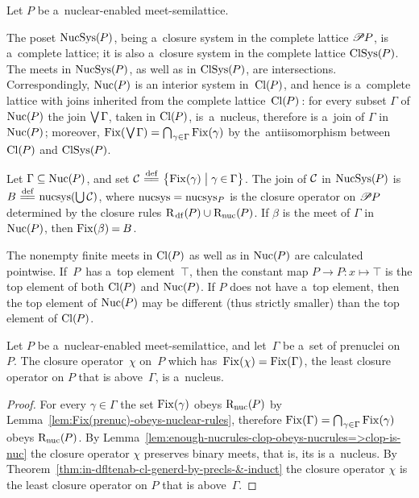 \documentclass[11pt,letterpaper]{article}
\renewcommand{\thmskip}{\bigskip}
\renewcommand{\interskip}{\medskip}
\begin{document}
Let $P$ be a~nuclear-enabled meet-semilattice.

The poset $\NucSys(\negtinysp P)$, %
	being a~closure system in the complete lattice $\Pow\negtinysp P$,
is a~complete lattice; it is also a~closure system in the complete lattice $\ClSys(\negtinysp P)$.
The meets in $\NucSys(\negtinysp P)$, as well as in $\ClSys(\negtinysp P)$, are intersections.
Correspondingly, $\Nuc(\negtinysp P)$ is an interior system in~$\Cl(\negtinysp P)$,
	and hence is a~complete lattice with joins inherited
		from the complete lattice~$\Cl(\negtinysp P)\dtinysp$:
for every subset $\Gamma$ of $\Nuc(\negtinysp P)$ the join $\tJoin\negtinysp\Gamma$,
	taken in $\Cl(\negtinysp P)$,
is~a~nucleus, therefore is a~join of $\Gamma$ in $\Nuc(\negtinysp P)\tinysp$;
moreover, $\Fix(\tinysp\tJoin\negtinysp\Gamma)=\Inters_{\tinysp\gamma\in\Gamma}\Fix(\gamma)$
by the~antiisomorphism between $\Cl(\negtinysp P)$ and $\ClSys(\negtinysp P)$.

Let $\Gamma\subseteq\Nuc(\negtinysp P)$,
	and set $\coll{C}\defeq\bigset{\Fix(\gamma)\bigsuchthat\gamma\narrt\in\Gamma}$.
The join of $\coll{C}$ in $\NucSys(\negtinysp P)$ is $B\defeq\nucsys(\tUnion\coll{C})$,
where $\nucsys=\nucsys_P$ is the closure operator on $\Pow\negtinysp P$
	determined by the closure rules $\Rulesdflt(\negtinysp P)\union\Rulesnuc(\negtinysp P)\tinysp$.
If $\beta$ is the meet of $\Gamma$ in $\Nuc(\negtinysp P)$, then $\Fix(\beta)\narrt=B$.

The nonempty finite meets in $\Cl(\negtinysp P)$ as well as in $\Nuc(\negtinysp P)$ are calculated pointwise.
If~$P$~has a~top element~$\top$,
then the constant map $P\to P : x\mapsto \top$
is the top element of both $\Cl(\negtinysp P)$ and $\Nuc(\negtinysp P)$.
If $P$ does not have a~top element,
then the top element of $\Nuc(\negtinysp P)$ may be different (thus strictly smaller)
	than the top element of $\Cl(\negtinysp P)$.

\thmskip

\begin{proposition}\label{prop:nuc-enab-meet-semilatt--nuc-generd-by-prenucs}
Let\/ $P$ be a~nuclear-enabled meet-semilattice, and let\/~$\Gamma$ be a~set of prenuclei on~$P$.
The closure operator\/~$\chi$ on\/~$P$ which has\/~$\Fix(\chi)=\Fix(\Gamma)\tinysp$,
	the least closure operator on\/ $P$ that is above\/~$\Gamma$,
is a~nucleus.
\end{proposition}

\interskip

\begin{proof}
For every $\gamma\in\Gamma$ the set $\Fix(\gamma)$ obeys $\Rulesnuc(\negtinysp P)$
	by Lemma~\ref{lem:Fix(prenuc)-obeys-nuclear-rules},
therefore $\Fix(\Gamma)=\tInters_{\tinysp\gamma\in\Gamma}\Fix(\gamma)$ obeys $\Rulesnuc(\negtinysp P)$.
By Lemma~\ref{lem:enough-nucrules-clop-obeys-nucrules=>clop-is-nuc}
	the closure operator $\chi$ preserves binary meets, that is, its is a~nucleus.
By Theorem~\ref{thm:in-dfltenab-cl-generd-by-precls-&-induct}
	the closure operator $\chi$ is the least closure operator on $P$ that is above~$\Gamma$.
\end{proof}
\end{document}
